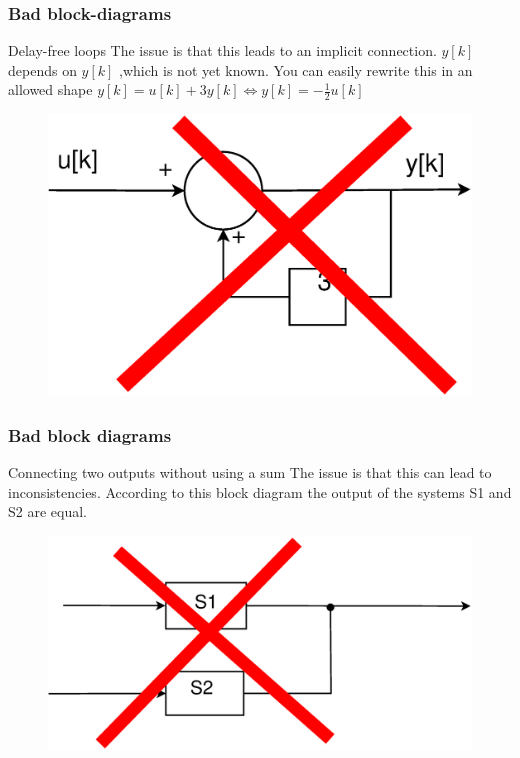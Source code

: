 \begin{frame}
	\frametitle{Bad block-diagrams}

				\begin{alertblock}{Delay-free loops}
					The issue is that this leads to an implicit connection. 
					$y[k]$ depends on $y[k]$ ,which is not yet known.
					You can easily rewrite this in an allowed shape
					$y[k] = u[k]  + 3 y[k] \Longleftrightarrow y[k] = -\frac{1}{2} u[k]$
					\begin{figure}
						\centering
						\includegraphics[height=0.4\textheight]{Images/Discrete_time_eps_10.eps}
					\end{figure}
				\end{alertblock}
\end{frame}
\begin{frame}
	\frametitle{Bad block diagrams}
		\begin{alertblock}{Connecting two outputs without using a sum}
			The issue is that this can lead to inconsistencies.	According to this block diagram the output of the systems S1 and S2 are equal.
			\begin{figure}
				\centering
				\includegraphics[width = 0.5\linewidth]{Images/Discrete_time_eps_15.eps}
			\end{figure}
		\end{alertblock}
\end{frame}
